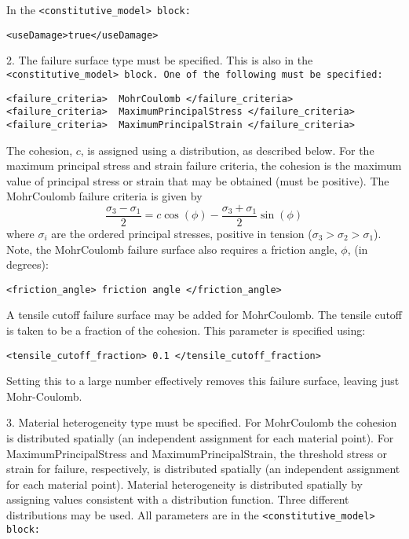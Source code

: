 \begin{enumerate}
In the \tt <constitutive\_model> \normalfont block:
\begin{Verbatim}[fontsize=\footnotesize]
<useDamage>true</useDamage>
\end{Verbatim}

2. The failure surface type must be specified.  This is also in the \tt <constitutive\_model> \normalfont 
block.  One of the following must be specified:

\begin{Verbatim}[fontsize=\footnotesize]
<failure_criteria>  MohrCoulomb </failure_criteria>
<failure_criteria>  MaximumPrincipalStress </failure_criteria>
<failure_criteria>  MaximumPrincipalStrain </failure_criteria>
\end{Verbatim}

The cohesion, $c$, is assigned using a distribution, as described below.  For the maximum 
principal stress and strain failure criteria, the cohesion is the maximum value of principal 
stress or strain that may be obtained (must be positive).  The MohrCoulomb failure criteria is
given by 
\begin{equation}
\frac{\sigma_3-\sigma_1}{2}=c\cos(\phi)-\frac{\sigma_3+\sigma_1}{2}\sin(\phi)
\end{equation}
where $\sigma_i$ are the ordered principal stresses, positive in tension 
($\sigma_3 > \sigma_2 > \sigma_1$).  Note, the MohrCoulomb failure 
surface also requires a friction angle, $\phi$, (in degrees):

\begin{Verbatim}[fontsize=\footnotesize]
<friction_angle> friction angle </friction_angle>
\end{Verbatim}

A tensile cutoff failure surface may be added for MohrCoulomb.
The tensile cutoff is taken to be a fraction of the cohesion.  
This parameter is specified using:

\begin{Verbatim}[fontsize=\footnotesize]
<tensile_cutoff_fraction> 0.1 </tensile_cutoff_fraction> 
\end{Verbatim}

Setting this to a large number effectively removes this failure surface, leaving just Mohr-Coulomb.

3. Material heterogeneity type must be specified.  For MohrCoulomb the cohesion is distributed 
spatially (an independent assignment for each material point).  For MaximumPrincipalStress and 
MaximumPrincipalStrain, the threshold stress or strain for failure, respectively, is distributed 
spatially (an independent assignment for each material point).  Material heterogeneity is 
distributed spatially by assigning values consistent with a distribution function.  Three different 
distributions may be used.  All parameters are in the \tt <constitutive\_model> \normalfont block:


\end{enumerate}
